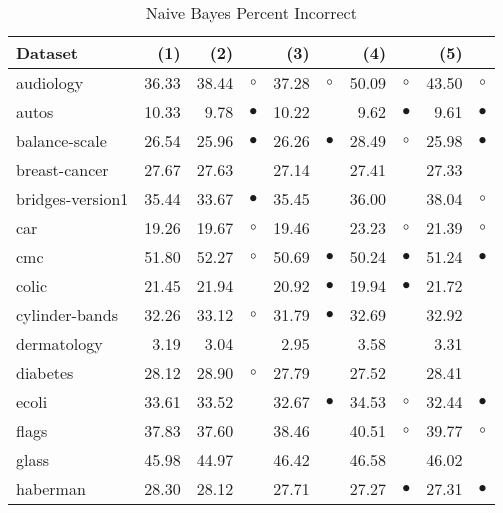 \newpage
{\centering \footnotesize \begin{longtable}{lrr@{\hspace{0.1cm}}cr@{\hspace{0.1cm}}cr@{\hspace{0.1cm}}cr@{\hspace{0.1cm}}c}
\caption{\label{nbpi}Naive Bayes Percent Incorrect}\\
\hline
Dataset & (1)& (2) & & (3) & & (4) & & (5) & \\
\hline
audiology & 36.33 & 38.44 &   $\circ$ & 37.28 &   $\circ$ & 50.09 &    $\circ$ & 43.50 &    $\circ$\\
autos & 10.33 &  9.78 & $\bullet$ & 10.22 &           &  9.62 &  $\bullet$ &  9.61 &  $\bullet$\\
balance-scale & 26.54 & 25.96 & $\bullet$ & 26.26 & $\bullet$ & 28.49 &    $\circ$ & 25.98 &  $\bullet$\\
breast-cancer & 27.67 & 27.63 &           & 27.14 &           & 27.41 &            & 27.33 &           \\
bridges-version1 & 35.44 & 33.67 & $\bullet$ & 35.45 &           & 36.00 &            & 38.04 &    $\circ$\\
car & 19.26 & 19.67 &   $\circ$ & 19.46 &           & 23.23 &    $\circ$ & 21.39 &    $\circ$\\
cmc & 51.80 & 52.27 &   $\circ$ & 50.69 & $\bullet$ & 50.24 &  $\bullet$ & 51.24 &  $\bullet$\\
colic & 21.45 & 21.94 &           & 20.92 & $\bullet$ & 19.94 &  $\bullet$ & 21.72 &           \\
cylinder-bands & 32.26 & 33.12 &   $\circ$ & 31.79 & $\bullet$ & 32.69 &            & 32.92 &           \\
dermatology &  3.19 &  3.04 &           &  2.95 &           &  3.58 &            &  3.31 &           \\
diabetes & 28.12 & 28.90 &   $\circ$ & 27.79 &           & 27.52 &            & 28.41 &           \\
ecoli & 33.61 & 33.52 &           & 32.67 & $\bullet$ & 34.53 &    $\circ$ & 32.44 &  $\bullet$\\
flags & 37.83 & 37.60 &           & 38.46 &           & 40.51 &    $\circ$ & 39.77 &    $\circ$\\
glass & 45.98 & 44.97 &           & 46.42 &           & 46.58 &            & 46.02 &           \\
haberman & 28.30 & 28.12 &           & 27.71 &           & 27.27 &  $\bullet$ & 27.31 &  $\bullet$\\

\end{longtable}}
